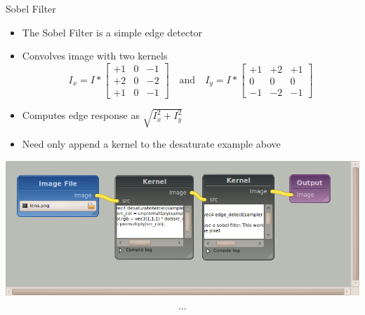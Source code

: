 \documentclass{beamer}
\newcommand{\bi}{\begin{itemize}}
\newcommand{\ei}{\end{itemize}}
\begin{document}
\begin{frame}{Sobel Filter}
  \bi
    \item The Sobel Filter is a simple edge detector
    \item Convolves image with two kernels
    \[
    I_x = I * \left[
      \begin{array}{ccc}
      +1 & 0 & -1 \\
      +2 & 0 & -2 \\
      +1 & 0 & -1
      \end{array}
      \right] 
      \quad\mbox{and}\quad
      I_y = I * \left[
      \begin{array}{ccc}
      +1 & +2 & +1 \\
      0 & 0 & 0 \\
      -1 & -2 & -1
      \end{array}
      \right] 
    \]
    \item Computes edge response as $\sqrt{I_x^2 + I_y^2}$
    \item Need only append a kernel to the desaturate example above
  \ei
\end{frame}

\begin{frame}
\includegraphics[width=\textwidth]{sobel-1-pipeline}
\end{frame}

\begin{frame}

\[ \cdots \]




\end{frame}

\begin{frame}

\end{frame}
\end{document}
